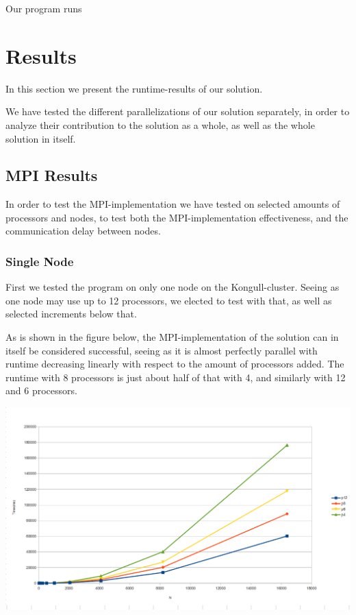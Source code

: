 \documentclass[fontsize=11pt,paper=a4,titlepage]{article}
\begin{document}
Our program runs


\section{Results}

In this section we present the runtime-results of our solution.

We have tested the different parallelizations of our solution separately, in
order to analyze their contribution to the solution as a whole, as well as the
whole solution in itself.

\subsection{MPI Results}

In order to test the MPI-implementation we have tested on selected amounts of
processors and nodes, to test both the MPI-implementation effectiveness, and the
communication delay between nodes.

\subsubsection{Single Node}

First we tested the program on only one node on the Kongull-cluster. Seeing as
one node may use up to 12 processors, we elected to test with that, as well as
selected increments below that.

As is shown in the figure below, the MPI-implementation of the
solution can in itself be considered successful, seeing as it is almost
perfectly parallel with runtime decreasing linearly with respect to the amount
of processors added. The runtime with 8 processors is just about half of that
with 4, and similarly with 12 and 6 processors.

\hspace*{-1.7cm}\includegraphics[scale=0.6]{pics/pX.png}
\end{document}

